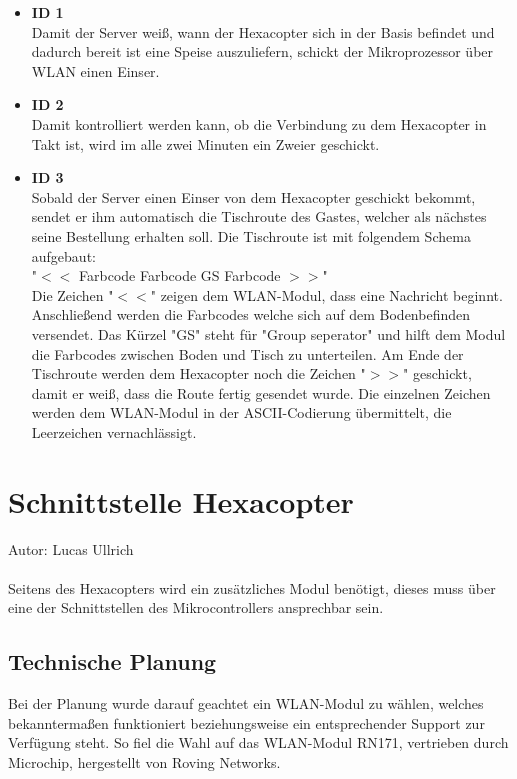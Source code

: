 \begin{itemize}
    \item \textbf{ID 1}\\
Damit der Server weiß, wann der Hexacopter sich in der Basis befindet und dadurch bereit ist eine Speise auszuliefern, schickt der Mikroprozessor über WLAN einen Einser.

    \item \textbf{ID 2}\\
Damit kontrolliert werden kann, ob die Verbindung zu dem Hexacopter in Takt ist, wird im alle zwei Minuten ein Zweier geschickt.

    \item \textbf{ID 3}\\
Sobald der Server einen Einser von dem Hexacopter geschickt bekommt, sendet er ihm automatisch die Tischroute des Gastes, welcher als nächstes seine Bestellung erhalten soll.
Die Tischroute ist mit folgendem Schema aufgebaut: \\
"$<<$ Farbcode Farbcode GS Farbcode $>>$" \\
Die Zeichen "$<<$" zeigen dem WLAN-Modul, dass eine Nachricht beginnt.
Anschließend werden die Farbcodes welche sich auf dem Bodenbefinden versendet.
Das Kürzel "GS" steht für "Group seperator" und hilft dem Modul die Farbcodes zwischen Boden und Tisch zu unterteilen.
Am Ende der Tischroute werden dem Hexacopter noch die Zeichen "$>>$" geschickt, damit er weiß, dass die Route fertig gesendet wurde.
Die einzelnen Zeichen werden dem WLAN-Modul in der ASCII-Codierung übermittelt, die Leerzeichen vernachlässigt.
  \end{itemize}

\section{Schnittstelle Hexacopter}
Autor: Lucas Ullrich\\ \\
Seitens des Hexacopters wird ein zusätzliches Modul benötigt, dieses muss über eine der Schnittstellen des Mikrocontrollers ansprechbar sein.

  \subsection{Technische Planung}
  Bei der Planung wurde darauf geachtet ein WLAN-Modul zu wählen, welches bekanntermaßen funktioniert beziehungsweise ein entsprechender Support zur Verfügung steht.
  So fiel die Wahl auf das WLAN-Modul RN171, vertrieben durch Microchip, hergestellt von Roving Networks.

